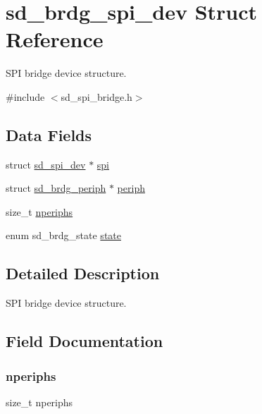 \hypertarget{structsd__brdg__spi__dev}{}\section{sd\+\_\+brdg\+\_\+spi\+\_\+dev Struct Reference}
\label{structsd__brdg__spi__dev}


S\+PI bridge device structure.  




{\ttfamily \#include $<$sd\+\_\+spi\+\_\+bridge.\+h$>$}

\subsection*{Data Fields}
\begin{DoxyCompactItemize}
\item 
struct \mbox{\hyperlink{structsd__spi__dev}{sd\+\_\+spi\+\_\+dev}} $\ast$ \mbox{\hyperlink{structsd__brdg__spi__dev_aa6d961a5da962ef8286ac1349a9156d3}{spi}}
\item 
struct \mbox{\hyperlink{structsd__brdg__periph}{sd\+\_\+brdg\+\_\+periph}} $\ast$ \mbox{\hyperlink{structsd__brdg__spi__dev_aa62455b7890e9ba5f38f475b23d6c276}{periph}}
\item 
size\+\_\+t \mbox{\hyperlink{structsd__brdg__spi__dev_a2d86c054b3f77df7560bbe59e0c7e965}{nperiphs}}
\item 
enum sd\+\_\+brdg\+\_\+state \mbox{\hyperlink{structsd__brdg__spi__dev_ac9c8b43ccc97ff45c6a3fb49d30b807e}{state}}
\end{DoxyCompactItemize}


\subsection{Detailed Description}
S\+PI bridge device structure. 

\subsection{Field Documentation}
\mbox{\label{structsd__brdg__spi__dev_a2d86c054b3f77df7560bbe59e0c7e965}} 
\subsubsection{\texorpdfstring{nperiphs}{nperiphs}}
{\footnotesize\ttfamily size\+\_\+t nperiphs}

